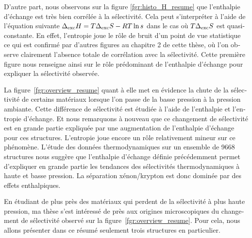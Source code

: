 \documentclass[thesis]{subfiles}
\begin{document}
\begin{otherlanguage}{french}
D'autre part, nous observons sur la figure \ref{fgr:histo_H_resume} que l'enthalpie d'échange est très bien corrélée à la sélectivité. Cela peut s'interpréter à l'aide de l'équation suivante $\Delta_{\text{exc}}H= T\Delta_{\text{exc}}S - RT\ln{s}$ dans le cas où $T\Delta_{\text{exc}}S$ est quasi-constante. En effet, l'entropie joue le rôle de bruit d'un point de vue statistique ce qui est confirmé par d'autres figures au chapitre 2 de cette thèse, où l'on observe clairement l'absence totale de corrélation avec la sélectivité. Cette première figure nous renseigne ainsi sur le rôle prédominant de l'enthalpie d'échange pour expliquer la sélectivité observée. 

La figure~\ref{fgr:overview_resume} quant à elle met en évidence la chute de la sélectivité de certains matériaux lorsque l'on passe de la basse pression à la pression ambiante. Cette différence de sélectivité est étudiée à l'aide de l'enthalpie et l'entropie d'échange. Et nous remarquons à nouveau que ce changement de sélectivité est en grande partie expliquée par une augmentation de l'enthalpie d'échange pour ces structures. L'entropie joue encore un rôle relativement mineur sur ce phénomène. L'étude des données thermodynamiques sur un ensemble de 9668 structures nous suggère que l'enthalpie d'échange définie précédemment permet d'expliquer en grande partie les tendances des sélectivités thermodynamiques à haute et basse pression. La séparation xénon/krypton est donc dominée par des effets enthalpiques. 

En étudiant de plus près des matériaux qui perdent de la sélectivité à plus haute pression, ma thèse s'est intéressé de près aux origines microscopiques du changement de sélectivité observé sur la figure~\ref{fgr:overview_resume}. Pour cela, nous allons présenter dans ce résumé seulement trois structures en particulier. 


\end{otherlanguage}
\end{document}
